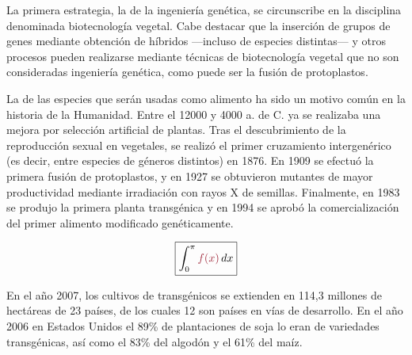 \documentclass[11pt,twoside]{article}
\begin{document}
\bigskip
La primera estrategia, la de la ingeniería genética, se circunscribe en la disciplina denominada biotecnología vegetal. Cabe destacar que la inserción de grupos de genes mediante obtención de híbridos ---incluso de especies distintas--- y otros procesos pueden realizarse mediante técnicas de biotecnología vegetal que no son consideradas ingeniería genética, como puede ser la fusión de protoplastos.





\bigskip
 La  de las especies que serán usadas como alimento ha sido un motivo común en la historia de la Humanidad. Entre el 12000 y 4000 a. de C. ya se realizaba una mejora por selección artificial de plantas. Tras el descubrimiento de la reproducción sexual en vegetales, se realizó el primer cruzamiento intergenérico (es decir, entre especies de géneros distintos) en 1876. En 1909 se efectuó la primera fusión de protoplastos, y en 1927 se obtuvieron mutantes de mayor productividad mediante irradiación con rayos X de semillas. Finalmente, en 1983 se produjo la primera planta transgénica y en 1994 se aprobó la comercialización del primer alimento modificado genéticamente.





\bigskip
\begin{equation*}
\boxed{
\int_0^\pi \textcolor{RojoUs}{f(x)} \, dx}
\end{equation*}





\bigskip
En el año 2007, los cultivos de transgénicos se extienden en 114,3 millones de hectáreas de 23 países, de los cuales 12 son países en vías de desarrollo.
En el año 2006 en Estados Unidos el 89\% de plantaciones de soja lo eran de variedades transgénicas, así como el 83\% del algodón y el 61\% del maíz.




\end{document}
